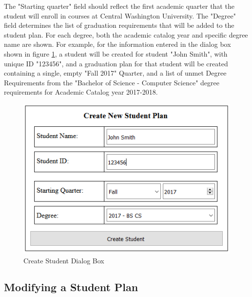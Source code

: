 \documentclass[]{article}
\begin{document}
		The "Starting quarter" field should reflect the first academic quarter that the student will enroll in courses at Central Washington University. The "Degree" field determines the list of graduation requirements that will be added to the student plan. For each degree, both the academic catalog year and specific degree name are shown. For example, for the information entered in the dialog box shown in figure \ref{createstudent}, a student will be created for student "John Smith", with unique ID "123456", and a graduation plan for that student will be created containing a single, empty "Fall 2017" Quarter, and a list of unmet Degree Requirements from the "Bachelor of Science - Computer Science" degree requirements for Academic Catalog year 2017-2018.
		\begin{figure}[H]
			\caption{Create Student Dialog Box}
			\label{createstudent}
			\centering
			\includegraphics{createstudent.PNG}
		\end{figure}
	\subsection{Modifying a Student Plan}\label{ssec:8}
	
\end{document}
